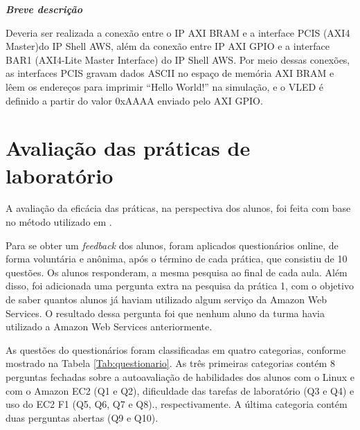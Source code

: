 \noindent\textbf{\textit{Breve descrição}}

Deveria ser realizada a conexão entre o IP AXI BRAM e a interface PCIS (AXI4 Master)do IP Shell AWS, além da conexão entre IP AXI GPIO e a interface BAR1 (AXI4-Lite Master Interface) do IP Shell AWS. Por meio dessas conexões, as interfaces PCIS gravam dados ASCII no espaço de memória AXI BRAM  e lêem os endereços para imprimir “Hello World!” na simulação, e o VLED é definido a partir do valor 0xAAAA enviado pelo AXI GPIO.


\section{Avaliação das práticas de laboratório}

A avaliação da eficácia das práticas, na perspectiva dos alunos, foi feita com base no método utilizado em \cite{yueac}.

Para se obter um \textit{feedback} dos alunos, foram aplicados questionários online, de forma voluntária e anônima, após o término de cada prática, que consistiu de 10 questões.  Os alunos responderam, a mesma pesquisa ao final de cada aula. Além disso, foi adicionada uma pergunta extra na pesquisa da prática 1, com o objetivo de saber quantos alunos já haviam utilizado algum serviço da Amazon Web Services. O resultado dessa pergunta foi que  nenhum aluno da turma havia utilizado a Amazon Web Services anteriormente.

As questões do questionários foram classificadas em quatro categorias, conforme mostrado na Tabela \ref{Tab:questionario}. As três primeiras categorias contém 8 perguntas fechadas sobre a autoavaliação de habilidades dos alunos com o Linux e com o Amazon EC2 (Q1 e Q2), dificuldade das tarefas de laboratório (Q3 e Q4) e uso do EC2 F1 (Q5, Q6, Q7 e Q8)., respectivamente. A última categoria contém duas perguntas abertas (Q9 e Q10).




